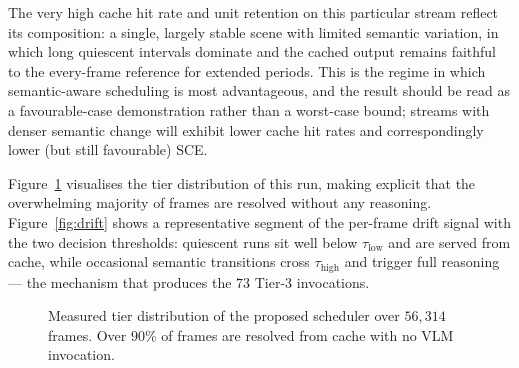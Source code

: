 The very high cache hit rate and unit retention on this particular stream
reflect its composition: a single, largely stable scene with limited semantic
variation, in which long quiescent intervals dominate and the cached output
remains faithful to the every-frame reference for extended periods. This is
the regime in which semantic-aware scheduling is most advantageous, and the
result should be read as a favourable-case demonstration rather than a
worst-case bound; streams with denser semantic change will exhibit lower cache
hit rates and correspondingly lower (but still favourable) SCE.

Figure~\ref{fig:tiers} visualises the tier distribution of this run, making
explicit that the overwhelming majority of frames are resolved without any
reasoning. Figure~\ref{fig:drift} shows a representative segment of the
per-frame drift signal with the two decision thresholds: quiescent runs sit
well below $\tau_{\text{low}}$ and are served from cache, while occasional
semantic transitions cross $\tau_{\text{high}}$ and trigger full reasoning ---
the mechanism that produces the $73$ Tier-3 invocations.

\begin{figure}[htbp]
\centering
{}
\caption[Tier distribution of the proposed run]{Measured tier distribution of
the proposed scheduler over $56{,}314$ frames. Over $90\%$ of frames are
resolved from cache with no VLM invocation.}
\label{fig:tiers}
\end{figure}

